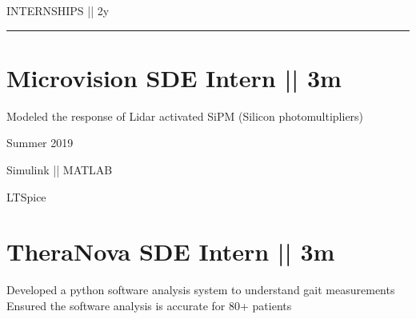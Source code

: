 \vspace{-1.4ex}
{
\hspace{-1.72in}\noindent\color{cblue}
{INTERNSHIPS  } 
{\small \color{black} || 2y}
}

\vspace{-1.6ex}
{\hspace{-1.73in}\noindent\color{dblue}\rule{6.935in}{0.4pt}} %

\vspace{-0.4ex}

\section
{\textbf{Microvision}
\newline
SDE Intern || 3m
\newline}


\vspace{-2.5ex}
\begin{detail}
\BulletItem
Modeled the response of Lidar activated SiPM (Silicon photomultipliers) 
\end{detail}

\begin{subtitle}
\vspace{-5ex}
{{Summer 2019}} 
\end{subtitle}

\vspace{-1.5ex}
{
\vspace{-0.8ex}
\color{cyan}\small
{Simulink || MATLAB} 
}

{
\vspace{-2.5ex}\hspace{1.5in}
\color{cyan}\small
{LTSpice} 
}

\vspace{0.8ex}
\section
{\textbf{TheraNova}
\newline
SDE Intern || 3m
}

\BulletItem
\vspace{-2.5ex}
\begin{detail}

\BulletItem
 Developed a python software analysis system to understand gait measurements
\BulletItem
 Ensured the software analysis is accurate for 80+ patients
\end{detail}

